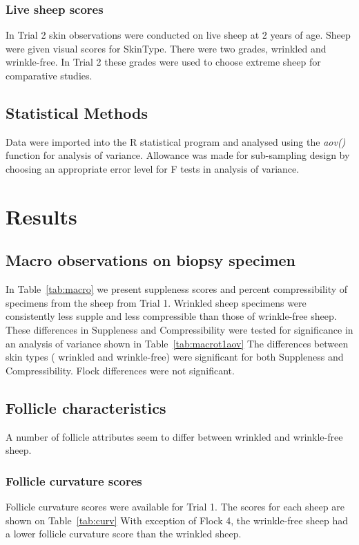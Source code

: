 \documentclass{article}
\begin{document}
\subsubsection{Live sheep scores}
In Trial 2 skin observations were conducted on live sheep at 2 years of age.
Sheep were given visual scores for SkinType. There were two grades, wrinkled and wrinkle-free. In Trial 2 these grades were used to choose extreme sheep for comparative studies. 

\subsection{Statistical Methods}

Data were imported into the R statistical program \cite{rcoreteam-2017} and analysed using the {\em aov()} function for analysis of variance.
Allowance was made for sub-sampling design by choosing  an appropriate error level for F tests in analysis of variance. 

\section{Results}

\subsection{Macro observations on biopsy specimen}
In Table~\ref{tab:macro} we present suppleness scores and percent compressibility of specimens from the sheep from Trial 1.
%
Wrinkled sheep specimens were consistently less supple and less compressible than those of wrinkle-free sheep.
These differences in Suppleness and Compressibility were tested for significance in an analysis of variance shown in Table~\ref{tab:macrot1aov}
%
The differences between skin types ( wrinkled and wrinkle-free) were significant for both Suppleness and Compressibility. Flock differences were not significant.



\subsection{Follicle characteristics}
A number of follicle attributes seem to differ between wrinkled and wrinkle-free sheep. 

\subsubsection{Follicle curvature scores}
Follicle curvature scores were available for Trial 1. The scores for each sheep are shown on Table~\ref{tab:curv}
%
With exception of Flock 4, the wrinkle-free sheep had a lower follicle curvature score than the wrinkled sheep.
\end{document}
